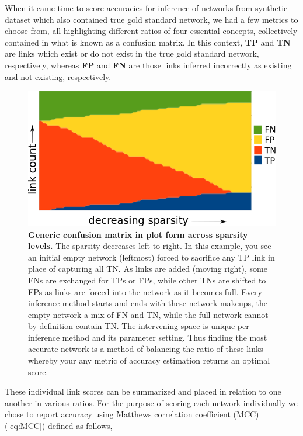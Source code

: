 When it came time to score accuracies for inference of networks from synthetic dataset which also contained true gold standard network, we had a few metrics to choose from, all highlighting different ratios of four essential concepts, collectively contained in what is known as a confusion matrix. In this context, \textbf{TP} and \textbf{TN} are links which exist or do not exist in the true gold standard network, respectively, whereas \textbf{FP} and \textbf{FN} are those links inferred incorrectly as existing and not existing, respectively.

\begin{figure}
\centering
\includegraphics[width=1\linewidth]{4/confusionMatrix_sparsity.png}
\caption{\textbf{Generic confusion matrix in plot form across sparsity levels.} The sparsity decreases left to right. In this example, you see an initial empty network (leftmost) forced to sacrifice any TP link in place of capturing all TN. As links are added (moving right), some FNs are exchanged for TPs or FPs, while other TNs are shifted to FPs as links are forced into the network as it becomes full. Every inference method starts and ends with these network makeups, the empty network a mix of FN and TN, while the full network cannot by definition contain TN. The intervening space is unique per inference method and its parameter setting. Thus finding the most accurate network is a method of balancing the ratio of these links whereby your any metric of accuracy estimation returns an optimal score.}
\label{fig:confusion}
\end{figure}

These individual link scores can be summarized and placed in relation to one another in various ratios. For the purpose of scoring each network individually we chose to report accuracy using Matthews correlation coefficient (MCC) (\cref{eq:MCC}) defined as follows,

